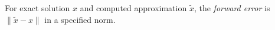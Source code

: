 
For exact solution $x$ and computed approximation $\widetilde x$, the \emph{forward error} is $\|\widetilde x-x\|$ in a specified norm.

